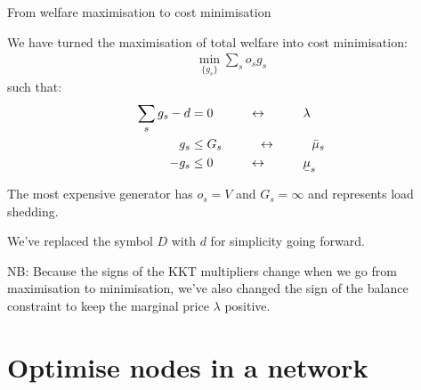 \documentclass[10pt,aspectratio=169,dvipsnames]{beamer}
\def\l{\lambda}
\def\m{\mu}
\newcommand{\ubar}[1]{\text{\b{$#1$}}}
\begin{document}
\begin{frame}{From welfare maximisation to cost minimisation}

 We have  turned the maximisation of total welfare into \alert{cost minimisation}:
  \begin{align*}
    \min_{\{g_s\}}  \sum_s o_s g_s
  \end{align*}
  such that:
  \begin{align*}
    \sum_s g_s - d & = 0  \hspace{1cm}\leftrightarrow\hspace{1cm} \l \\
        g_s  & \leq  G_s  \hspace{1cm}\leftrightarrow\hspace{1cm} \bar{\m}_s \\
    - g_s  & \leq  0  \hspace{1cm}\leftrightarrow\hspace{1cm} \ubar{\m}_s
  \end{align*}

  The most expensive generator has $o_s = V$ and $G_s = \infty$ and
  represents \alert{load shedding}.

  We've replaced the symbol $D$  with $d$ for simplicity going forward.



  NB: Because the signs of the KKT multipliers change when we go from
  maximisation to minimisation, we've also changed the sign of the
  balance constraint to keep the marginal price $\l$ positive.
\end{frame}


\section{Optimise nodes in a network}
\end{document}
